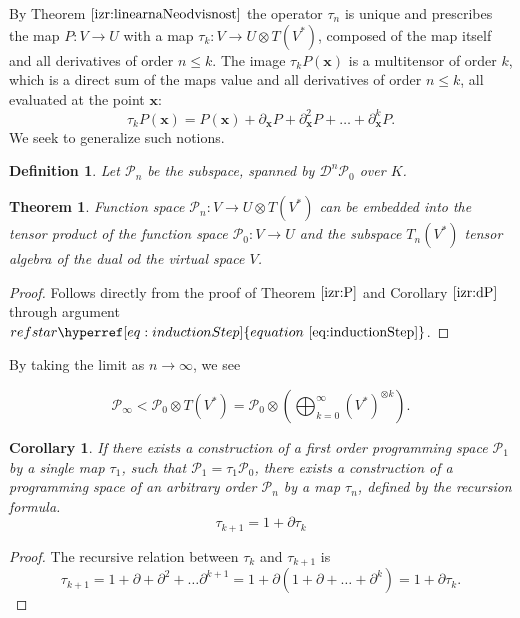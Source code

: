 \documentclass{article}
\makeatletter
\newcommand{\x}{\mathbf{x}}
\newcommand{\dP}{\mathcal{P}}
\newcommand{\D}{\partial}
\newcommand{\DD}{\mathcal{D}}
\newcommand{\sumd}{\tau}
\newtheorem{definicija}{Definition}[section]
\newtheorem{izrek}{Theorem}[section]
\newtheorem{corollary}{Corollary}[section]
\let\originaleqref\eqref %
\renewcommand{\eqref}[1]{%
  \begingroup%
  \let\ref\@refstar%
  \hyperref[#1]{%
    equation%
    ~\originaleqref{#1}%
  }%
  \endgroup
}
\makeatother
\begin{document}
  By Theorem $\ref{izr:linearnaNeodvisnost}$ the operator $\sumd_n$ is unique and prescribes the map $P: V\to U$ with a map $\sumd_k:V\to
U\otimes T(V^*)$, composed of the map itself and all derivatives of order $n\le k$. The image $\sumd_kP(\x)$ is a multitensor of order $k$, which is a direct sum of the maps value and all derivatives of order $n\le k$, all evaluated at the point $\x$:
\begin{equation}
  \label{eq:multi_odvod}
  \sumd_kP(\x) = P(\x)+\D_\x P + \D^2_\x P + \ldots + \D^k_\x P.
\end{equation}
We seek to generalize such notions.

\begin{definicija}\label{def:P_n}
Let $\dP_n$ be the subspace, spanned by $\DD^n\dP_0$ over $K$.
 \end{definicija}
 
 \begin{izrek}\label{izr:P_n}
 	Function space $\dP_n:V\to U\otimes T(V^*)$ can be embedded into the tensor
  product of the function space $\dP_0:V\to U$ and the subspace $T_n(V^*)$
  tensor algebra of the dual od the virtual space $V$. 
 \end{izrek}
 
 \begin{proof} Follows directly from the proof of Theorem $\ref{izr:P}$ and Corollary $\ref{izr:dP}$ through argument $\eqref{eq:inductionStep}$.
  \end{proof}
By taking the limit as $n\to \infty$, we see
 	
 	\begin{equation}
 	\label{eq:P_algebra}
 	 	    \dP_\infty < \dP_0\otimes T(V^*) = \dP_0 \otimes\left(\bigoplus_{k=0}^\infty (V^*)^{\otimes k} \right).
 	\end{equation}

  \begin{corollary}
  If there exists a construction of a first order programming space $\dP_1$ by a
  single map $\sumd_1$, such that $\dP_1=\sumd_1\dP_0$, there exists a
  construction of a programming space of an arbitrary order $\dP_n$ by a map
  $\sumd_n$, defined by the recursion formula.
  \begin{equation}
    \label{eq:potenca(1+d)}
    \sumd_{k+1}=1+\D\sumd_{k}
  \end{equation}

  \end{corollary}
  \begin{proof}
    The recursive relation between $\sumd_k$ and $\sumd_{k+1}$ is
    \begin{equation}
      \label{eq:rekurzija}
      \sumd_{k+1} = 1 + \D +\D^2+\ldots \D^{k+1} = 1+\D(1+\D+\ldots +\D^{k}) = 1+\D\sumd_k.
    \end{equation} 

  \end{proof}
       
\end{document}
